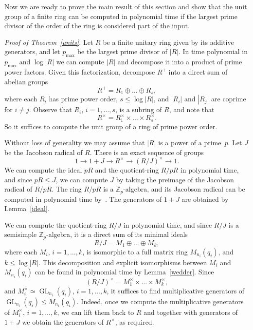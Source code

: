 \documentclass{article}
\DeclareMathOperator{\GL}{GL}
\begin{document}
Now we are ready to prove the main result of this section and show that the unit group of a finite ring can be computed in polynomial time
if the largest prime divisor of the order of the ring is considered part of the input.
\medskip

\noindent
\emph{Proof of Theorem~\ref{units}.}
Let \( R \) be a finite unitary ring given by its additive generators, and let \( p_{\max} \) be the largest prime divisor of \( |R| \).
In time polynomial in \( p_{\max} \) and \( \log |R| \) we can compute \( |R| \) and decompose it into a product of prime power factors.
Given this factorization, decompose \( R^+ \) into a direct sum of abelian groups
\[ R^+ = R_1 \oplus \dots \oplus R_s, \]
where each \( R_i \) has prime power order, \( s \leq \log |R| \), and \( |R_i| \) and \( |R_j| \) are coprime for \( i \neq j \).
Observe that \( R_i \), \( i = 1, \dots, s \), is a subring of \( R \), and note that
\[ R^\times = R_1^\times \times \dots \times R_s^\times. \]
So it suffices to compute the unit group of a ring of prime power order.

Without loss of generality we may assume that \( |R| \) is a power of a prime~\( p \).
Let \( J \) be the Jacobson radical of \( R \). There is an exact sequence of groups
\[ 1 \longrightarrow 1+J \longrightarrow R^\times \longrightarrow (R/J)^\times \longrightarrow 1. \]
We can compute the ideal \( pR \) and the quotient-ring \( R/pR \) in polynomial time,
and since \( pR \leq J \), we can compute \( J \) by taking the preimage of the Jacobson radical of \( R/pR \).
The ring \( R/pR \) is a \( \mathbb{Z}_p \)-algebra, and its Jacobson radical can be computed in polynomial time by~\cite[Theorem~1.5A]{fr}.
The generators of \( 1 + J \) are obtained by Lemma~\ref{ideal}.

We can compute the quotient-ring \( R/J \) in polynomial time, and since \( R/J \) is a semisimple \( \mathbb{Z}_p \)-algebra,
it is a direct sum of its minimal ideals
\[ R/J = M_1 \oplus \dots \oplus M_k, \]
where each \( M_i \), \( i = 1, \dots, k \), is isomorphic to a full matrix ring \( M_{n_i}(q_i) \), and \( k \leq \log |R| \).
This decomposition and explicit isomorphisms between \( M_i \) and \( M_{n_i}(q_i) \) can be found in polynomial time by Lemma~\ref{wedder}.
Since
\[ (R/J)^\times = M_1^\times \times \dots \times M_k^\times, \]
and \( M_i^\times \simeq \GL_{n_i}(q_i) \), \( i = 1, \dots, k \),
it suffices to find multiplicative generators of \( \GL_{n_i}(q_i) \leq M_{n_i}(q_i) \).
Indeed, once we compute the multiplicative generators of \( M_i^\times \), \( i = 1, \dots, k \),
we can lift them back to \( R \) and together with generators of \( 1 + J \) we obtain the generators of \( R^\times \), as required.
\end{document}
